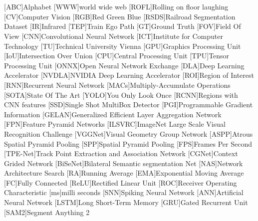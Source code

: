 {}
\chapter*{\listacroname}
\begin{acronym}[XXXXX]
    [ABC]{Alphabet}
    [WWW]{world wide web}
    [ROFL]{Rolling on floor laughing}
    [CV]{Computer Vision}
    [RGB]{Red Green Blue}
    [RSDS]{Railroad Segmentation Dataset}
    [IR]{Infrared}
    [TEP]{Train Ego Path}
    [GT]{Ground Truth}
    [FOV]{Field Of View}
    [CNN]{Convolutional Neural Network}
    [ICT]{Institute for Computer Technology}
    [TU]{Technical University Vienna}
    [GPU]{Graphics Processing Unit}
    [IoU]{Intersection Over Union}
    [CPU]{Central Processing Unit}
    [TPU]{Tensor Processing Unit}
    [ONNX]{Open Neural Network Exchange}
    [DLA]{Deep Learning Accelerator}
    [NVDLA]{NVIDIA Deep Learning Accelerator}
    [ROI]{Region of Interest}
    [RNN]{Recurrent Neural Network}
    [MACs]{Multiply-Accumulate Operations}
    [SOTA]{State Of The Art}
    [YOLO]{You Only Look Once}
    [RCNN]{Regions with CNN features}
    [SSD]{Single Shot MultiBox Detector}
    [PGI]{Programmable Gradient Information}
    [GELAN]{Generalized Efficient Layer Aggregation Network}
    [FPN]{Feature Pyramid Networks}
    [ILSVRC]{ImageNet Large Scale Visual Recognition Challenge}
    [VGGNet]{Visual Geometry Group Network}
    [ASPP]{Atrous Spatial Pyramid Pooling}
    [SPP]{Spatial Pyramid Pooling}
    [FPS]{Frames Per Second}
    [TPE-Net]{Track Point Extraction and Association Network}
    [CGNet]{Context Grided Network}
    [BiSeNet]{Bilateral Semantic segmentation Net}
    [NAS]{Network Architecture Search}
    [RA]{Running Average}
    [EMA]{Exponential Moving Average}
    [FC]{Fully Connected}
    [ReLU]{Rectified Linear Unit}
    [ROC]{Receiver Operating Characteristic}
    [ms]{milli seconds}
    [SNN]{Spiking Neural Network}
    [ANN]{Artificial Neural Network}
    [LSTM]{Long Short-Term Memory}
    [GRU]{Gated Recurrent Unit}
    [SAM2]{Segment Anything 2}
\end{acronym}